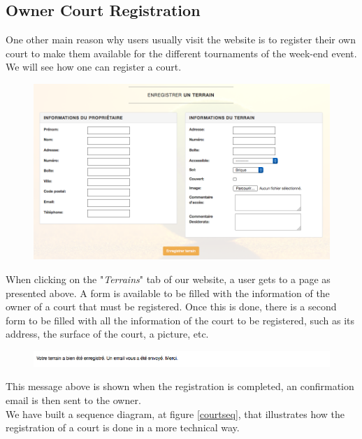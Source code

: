 \documentclass[a4paper, 12pt]{article}
\begin{document}
\subsection*{Owner Court Registration}

One other main reason why users usually visit the website is to register their own court to make them available for the different tournaments of the week-end event. We will see how one can register a court.\\


\begin{figure}[h]
\includegraphics[scale=0.5]{registercourt.png}
\end{figure}

When clicking on the "\textit{Terrains}" tab of our website, a user gets to a page as presented above. A form is available to be filled with the information of the owner of a court that must be registered. Once this is done, there is a second form to be filled with all the information of the court to be registered, such as its address, the surface of the court, a picture, etc.\\

\begin{figure}[h]
\includegraphics[scale=0.5]{courtmail.png}
\end{figure}

This message above is shown when the registration is completed, an confirmation email is then sent to the owner.\\

We have built a sequence diagram, at figure \ref{courtseq}, that illustrates how the registration of a court is done in a more technical way.\\
\end{document}

